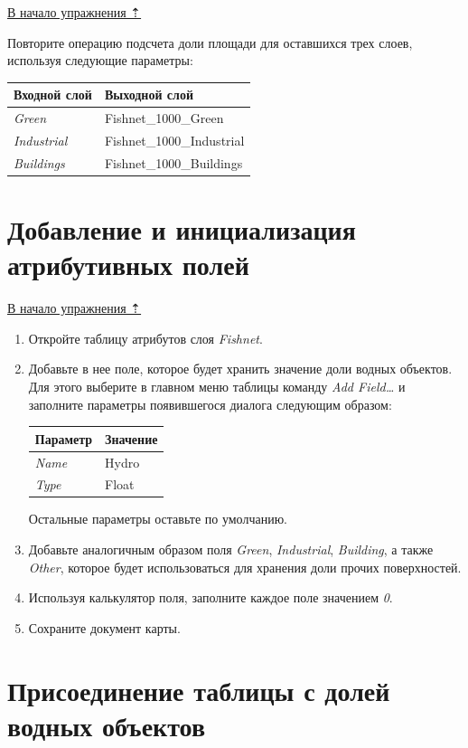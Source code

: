 \documentclass[12pt,]{book}
\begin{document}
\protect\hyperlink{land-cover-hydro}{В начало упражнения ⇡}

Повторите операцию подсчета доли площади для оставшихся трех слоев, используя следующие параметры:

\begin{longtable}[]{@{}ll@{}}
\toprule
Входной слой & Выходной слой\tabularnewline
\midrule
\endhead
\emph{Green} & Fishnet\_1000\_Green\tabularnewline
\emph{Industrial} & Fishnet\_1000\_Industrial\tabularnewline
\emph{Buildings} & Fishnet\_1000\_Buildings\tabularnewline
\bottomrule
\end{longtable}

\hypertarget{land-cover-hydro-fields}{%
\section{Добавление и инициализация атрибутивных полей}\label{land-cover-hydro-fields}}

\protect\hyperlink{land-cover-hydro}{В начало упражнения ⇡}

\begin{enumerate}
\def\labelenumi{\arabic{enumi}.}
\item
  Откройте таблицу атрибутов слоя \emph{Fishnet}.
\item
  Добавьте в нее поле, которое будет хранить значение доли водных объектов. Для этого выберите в главном меню таблицы команду \emph{Add Field\ldots{}} и заполните параметры появившегося диалога следующим образом:

  \begin{longtable}[]{@{}ll@{}}
  \toprule
  Параметр & Значение\tabularnewline
  \midrule
  \endhead
  \emph{Name} & Hydro\tabularnewline
  \emph{Type} & Float\tabularnewline
  \bottomrule
  \end{longtable}

  Остальные параметры оставьте по умолчанию.
\item
  Добавьте аналогичным образом поля \emph{Green}, \emph{Industrial}, \emph{Building}, а также \emph{Other}, которое будет использоваться для хранения доли прочих поверхностей.
\item
  Используя калькулятор поля, заполните каждое поле значением \emph{0}.
\item
  Сохраните документ карты.
\end{enumerate}

\hypertarget{land-cover-hydro-water-tables}{%
\section{Присоединение таблицы с долей водных объектов}\label{land-cover-hydro-water-tables}}
\end{document}
